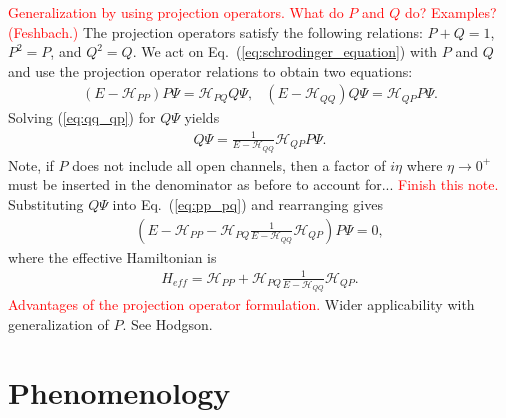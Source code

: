 \documentclass[preprintnumbers,floatfix,aps,prc,preprint,nofootinbib]{revtex4-1}
\begin{document}
\textcolor{red}{Generalization by using projection operators. What do $P$ and $Q$ do? Examples? (Feshbach.)} The projection operators satisfy the following relations: $P+Q=1$, $P^2 = P$, and $Q^2 = Q$. We act on Eq.~(\ref{eq:schrodinger_equation}) with $P$ and $Q$ and use the projection operator relations to obtain two equations:
%
\begin{subequations}
	\label{eq:intermediate_effective_hamiltonian_equations}
	\begin{eqnarray}
		\label{eq:pp_pq}
		(E - \mathcal{H}_{PP}) P \Psi = \mathcal{H}_{PQ} Q \Psi,
	\end{eqnarray}
	\begin{eqnarray}
		\label{eq:qq_qp}
		(E - \mathcal{H}_{QQ}) Q \Psi = \mathcal{H}_{QP} P \Psi.
	\end{eqnarray}
\end{subequations}
%
Solving (\ref{eq:qq_qp}) for $Q \Psi$ yields
%
\begin{eqnarray}
	\label{eq:q_psi}
	Q \Psi = \frac{1}{E - \mathcal{H}_{QQ}} \mathcal{H}_{QP} P \Psi.
\end{eqnarray}
%
Note, if $P$ does not include all open channels, then a factor of $i \eta$ where $\eta \rightarrow 0^+$ must be inserted in the denominator as before to account for... \textcolor{red}{Finish this note.} Substituting $Q \Psi$ into Eq.~(\ref{eq:pp_pq}) and rearranging gives
%
\begin{eqnarray}
	\label{p_psi}
	(E - \mathcal{H}_{PP} - \mathcal{H}_{PQ} \frac{1}{E - \mathcal{H}_{QQ}} \mathcal{H}_{QP}) P \Psi = 0,
\end{eqnarray}
%
where the effective Hamiltonian is
%
\begin{eqnarray}
	\label{eq:effective_hamiltonian}
	H_{eff} = \mathcal{H}_{PP} + \mathcal{H}_{PQ} \frac{1}{E - \mathcal{H}_{QQ}} \mathcal{H}_{QP}.
\end{eqnarray}
%
%
\textcolor{red}{Advantages of the projection operator formulation.} Wider applicability with generalization of $P$. See Hodgson.


\section{Phenomenology}
\label{sec:phenomenology}
\end{document}
